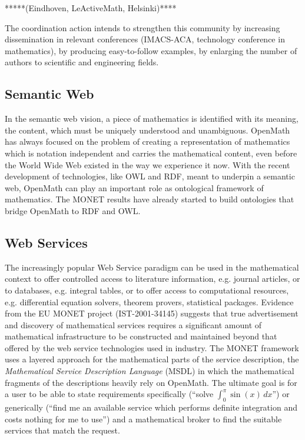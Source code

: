 \documentclass[draft]{artikel3}
\begin{document}
*****(Eindhoven, LeActiveMath, Helsinki)****

The coordination action intends to strengthen this community by
increasing dissemination in relevant conferences (IMACS-ACA,
technology conference in mathematics), by producing easy-to-follow
examples, by enlarging the number of authors to scientific and
engineering fields.



\subsection{Semantic Web}
\label{sec:semw}

In the semantic web vision, a piece of mathematics is identified with
its meaning, the content, which must be uniquely understood and
unambiguous. OpenMath has always focused on the problem of creating a
representation of mathematics which is notation independent and
carries the mathematical content, even before the World Wide Web
existed in the way we experience it now. With the recent development
of technologies, like OWL and RDF, meant to underpin a semantic web,
OpenMath can play an important role as ontological framework of
mathematics. The MONET results have already started to build
ontologies that bridge OpenMath to RDF and OWL.




\subsection{Web Services}
\label{sec:ws}

The increasingly popular Web Service paradigm can be used in the
mathematical context to offer controlled access to literature
information, e.g. journal articles, or to databases, e.g. integral
tables, or to offer access to computational resources, e.g.
differential equation solvers, theorem provers, statistical packages.
Evidence from the EU MONET project (IST-2001-34145) suggests that true
advertisement and discovery of mathematical services requires a
significant amount of mathematical infrastructure to be constructed
and maintained beyond that offered by the web service technologies
used in industry.  The MONET framework uses a layered approach for the
mathematical parts of the service description, the \emph{Mathematical
  Service Description Language} (MSDL) in which the mathematical
fragments of the descriptions heavily rely on OpenMath.  The ultimate
goal is for a user to be able to state requirements specifically
(``solve $\int_0^\pi{}\sin(x)\,dx$'') or generically (``find me an
available service which performs definite integration and costs
nothing for me to use'') and a mathematical broker to find the
suitable services that match the request.
\end{document}
